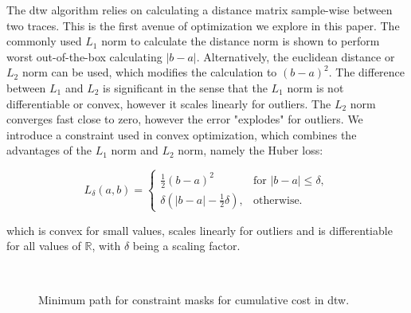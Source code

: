 The \ac{dtw} algorithm relies on calculating a distance matrix sample-wise between two traces. This is the first avenue of optimization we explore in this paper. The commonly used $L_1$ norm to calculate the distance norm is shown to perform worst out-of-the-box calculating $|b-a|$. Alternatively, the euclidean distance or $L_2$ norm can be used, which modifies the calculation to $(b-a)^2$. The difference between $L_1$ and $L_2$ is significant in the sense that the $L_1$ norm is not differentiable or convex, however it scales linearly for outliers. The $L_2$ norm converges fast close to zero, however the error "explodes" for outliers. We introduce a constraint used in convex optimization, which combines the advantages of the $L_1$ norm and $L_2$ norm, namely the Huber loss:

\begin{equation}
L_\delta (a, b) = 
\begin{cases}
 \frac{1}{2} (b-a)^2 & \text{for } |b-a| \le \delta, \\
 \delta (|b-a| - \frac{1}{2} \delta), & \text{otherwise.}
\end{cases}
\label{eq:huber}
\end{equation}

which is convex for small values, scales linearly for outliers and is differentiable for all values of $\mathbb{R}$, with $\delta$ being a scaling factor.


\begin{figure}[!ht]
    ~
    ~
\caption{Minimum path for constraint masks for cumulative cost in \ac{dtw}.}
\label{fig:constraints}
\end{figure} 

